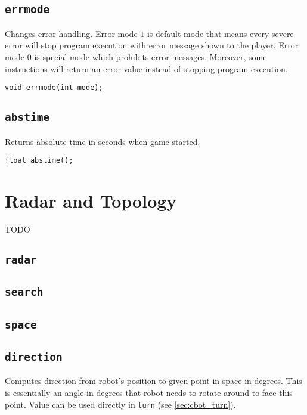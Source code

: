 \subsection{\texttt{errmode}}
Changes error handling. Error mode $1$ is default mode that means every severe error will stop program execution with error message shown to the player. Error mode $0$ is special mode which prohibits error messages. Moreover, some instructions will return an error value instead of stopping program execution.

\begin{lstlisting}
void errmode(int mode);
\end{lstlisting}


\subsection{\texttt{abstime}}
Returns absolute time in seconds when game started.

\begin{lstlisting}
float abstime();
\end{lstlisting}


\section{Radar and Topology}

TODO

\subsection{\texttt{radar}}
\subsection{\texttt{search}}
\subsection{\texttt{space}}
\subsection{\texttt{direction}}
Computes direction from robot's position to given point in space in degrees. This is essentially an angle in degrees that robot needs to rotate around to face this point. Value can be used directly in \texttt{turn} (see \ref{sec:cbot_turn}).

